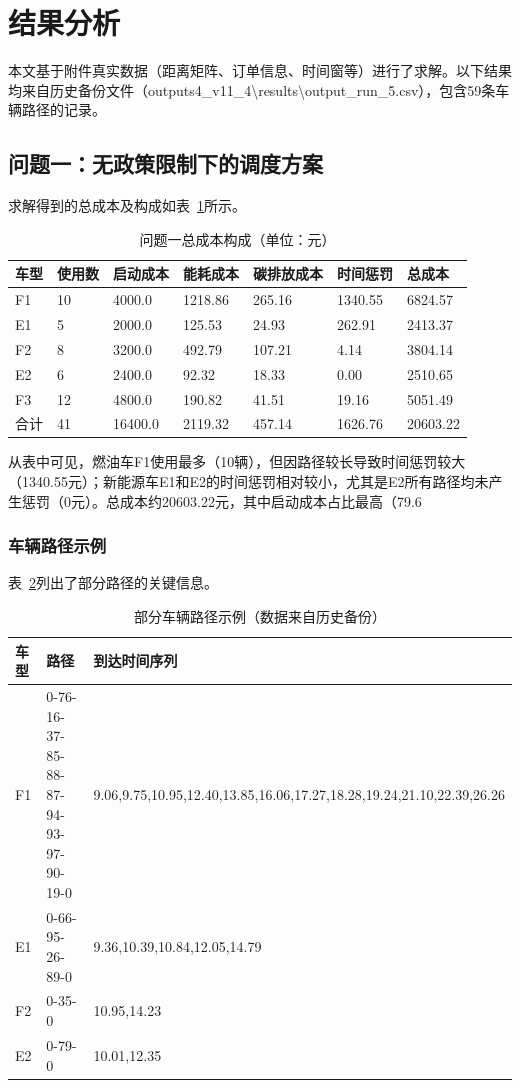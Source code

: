 \documentclass[11pt,a4paper]{article}
\begin{document}
\section{结果分析}

本文基于附件真实数据（距离矩阵、订单信息、时间窗等）进行了求解。以下结果均来自历史备份文件（outputs4\_v11\_4\textbackslash results\textbackslash output\_run\_5.csv），包含59条车辆路径的记录。

\subsection{问题一：无政策限制下的调度方案}
求解得到的总成本及构成如表~\ref{tab:q1_cost}所示。

\begin{table}[htbp]
\centering
\caption{问题一总成本构成（单位：元）}
\label{tab:q1_cost}
\begin{tabular}{lllllll}
\toprule
车型 & 使用数 & 启动成本 & 能耗成本 & 碳排放成本 & 时间惩罚 & 总成本 \\
\midrule
F1 & 10 & 4000.0 & 1218.86 & 265.16 & 1340.55 & 6824.57 \\
E1 & 5 & 2000.0 & 125.53 & 24.93 & 262.91 & 2413.37 \\
F2 & 8 & 3200.0 & 492.79 & 107.21 & 4.14 & 3804.14 \\
E2 & 6 & 2400.0 & 92.32 & 18.33 & 0.00 & 2510.65 \\
F3 & 12 & 4800.0 & 190.82 & 41.51 & 19.16 & 5051.49 \\
\midrule
合计 & 41 & 16400.0 & 2119.32 & 457.14 & 1626.76 & 20603.22 \\
\bottomrule
\end{tabular}
\end{table}


从表中可见，燃油车F1使用最多（10辆），但因路径较长导致时间惩罚较大（1340.55元）；新能源车E1和E2的时间惩罚相对较小，尤其是E2所有路径均未产生惩罚（0元）。总成本约20603.22元，其中启动成本占比最高（79.6%

\subsubsection*{车辆路径示例}
表~\ref{tab:route_example}列出了部分路径的关键信息。

\begin{table}[htbp]
\centering
\caption{部分车辆路径示例（数据来自历史备份）}
\label{tab:route_example}
\begin{tabular}{lll}
\toprule
车型 & 路径 & 到达时间序列 \\
\midrule
F1 & 0-76-16-37-85-88-87-94-93-97-90-19-0 & 9.06,9.75,10.95,12.40,13.85,16.06,17.27,18.28,19.24,21.10,22.39,26.26 \\
E1 & 0-66-95-26-89-0 & 9.36,10.39,10.84,12.05,14.79 \\
F2 & 0-35-0 & 10.95,14.23 \\
E2 & 0-79-0 & 10.01,12.35 \\
\bottomrule
\end{tabular}
\end{table}
\end{document}
